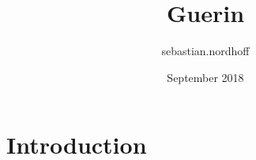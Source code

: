 \documentclass{article}
\title{Guerin}
\author{sebastian.nordhoff }
\date{September 2018}
\begin{document}
\maketitle

\section{Introduction}
\end{document}
